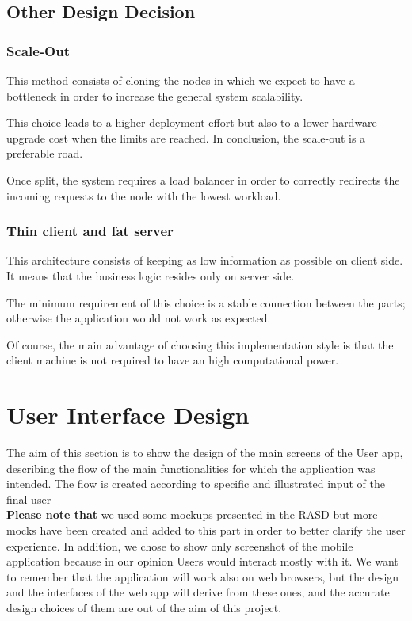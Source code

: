 \documentclass[table, 12pt]{article}
\begin{document}
\subsection{Other Design Decision}
\subsubsection{Scale-Out}
This method consists of cloning the nodes in which we expect to have a bottleneck in order to increase the general system scalability.

This choice leads to a higher deployment effort but also to a lower hardware upgrade cost when the limits are reached. In conclusion, the scale-out is a preferable road.

Once split, the system requires a load balancer in order to correctly redirects the incoming requests to the node with the lowest workload.

\subsubsection{Thin client and fat server}
This architecture consists of keeping as low information as possible on client side. It means that the business logic resides only on server side.

The minimum requirement of this choice is a stable connection between the parts; otherwise the application would not work as expected.

Of course, the main advantage of choosing this implementation style is that the client machine is not required to have an high computational power.

\section{User Interface Design}
The aim of this section is to show the design of the main screens of the User app, describing the flow of the main functionalities for which the application was intended. The flow is created according to specific and illustrated input of the final user \\
\textbf{Please note that} we used some mockups presented in the RASD but more mocks have been created and added to this part in order to better clarify the user experience. In addition, we chose to show only screenshot of the mobile application because in our opinion Users would interact mostly with it. We want to remember that the application will work also on web browsers, but the design and the interfaces of the web app will derive from these ones, and the accurate design choices of them are out of the aim of this project. \\
\end{document}
